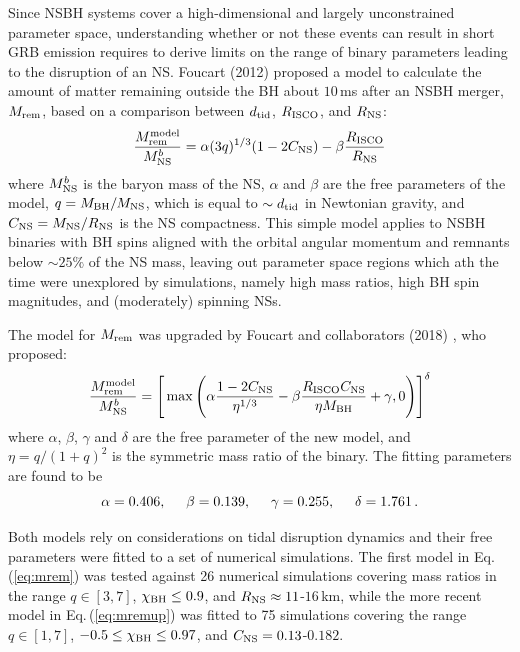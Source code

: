 \documentclass[binding=0.6cm, LaM]{sapthesis}
\begin{document}
        Since NSBH systems cover a high-dimensional and largely unconstrained parameter space,
        understanding whether or not these events can result in short GRB emission requires to
        derive limits on the range of binary parameters leading to the disruption of an NS.
        Foucart (2012) \cite{50} proposed a model to calculate the amount of matter remaining
        outside the BH about $10\,$ms after an NSBH merger, $M_{\rm rem}$, based on a comparison
        between $d_{\rm tid}$, $R_{\rm ISCO}$, and $R_{\rm NS}$:
        \begin{equation}
          \label{eq:mrem}
          {{M_{\rm rem}^{\rm model}} \over {M^b_{\rm NS}}} = \alpha(3q)^{1/3}(1 - 2C_{\rm NS}) - \beta{{R_{\rm ISCO}} \over {R_{\rm NS}}}
        \end{equation}
        where $M^b_{\rm NS}$ is the baryon mass of the NS, $\alpha$ and $\beta$ are the free parameters of the model,
        $q=M_{\rm BH}/M_{\rm NS}$, which is equal to $\sim d_{\rm tid}$ in Newtonian gravity, and $C_{\rm NS} = M_{\rm NS}/R_{\rm NS}$ is the NS compactness. 
        This simple model applies to NSBH binaries with BH spins aligned with the orbital angular momentum and remnants below
        $\sim 25\%$ of the NS mass, leaving out parameter space regions which ath the time were unexplored by simulations, 
        namely high mass ratios, high BH spin magnitudes, and (moderately) spinning NSs.

        The model for $M_{\rm rem}$ was upgraded by Foucart and collaborators (2018) \cite{54}, who proposed:
        \begin{equation}
          \label{eq:mremup}
          {{M_{\rm rem}^{\rm model}} \over {M^b_{\rm NS}}} = \Bigg[ \max \Bigg( \alpha{{1 - 2C_{\rm NS}} \over {\eta^{1/3}}} - \beta {{R_{\rm ISCO}C_{\rm NS}} \over{\eta M_{\rm BH}}} + \gamma, 0 \Bigg)\Bigg]^{\delta}
        \end{equation}
        where $\alpha$, $\beta$, $\gamma$ and $\delta$ are the free parameter of the new model, and $\eta = q/(1+q)^2$ is the symmetric mass ratio of the binary.  The fitting parameters are found to be
	\begin{equation}
		\alpha=0.406, \hspace*{0.5cm}  \beta=0.139, \hspace*{0.5cm}  \gamma=0.255, \hspace*{0.5cm} \delta=1.761\,.
	\end{equation}

        Both models rely on considerations on tidal disruption dynamics and
        their free parameters were fitted to a set of numerical simulations.
        The first model in Eq.\,(\ref{eq:mrem}) was tested against 26 numerical simulations covering mass ratios
        in the range $q\in [3,7]$, $\chi_{\rm BH}\leq 0.9$, and $R_{\rm NS} \approx 11$-$16\,$km,
        while the more recent model in Eq.\,(\ref{eq:mremup}) was fitted to 75 simulations covering the range $q\in [1,7]$, $-0.5 \leq \chi_{\rm BH}\leq 0.97$,
        and $C_{\rm NS} = 0.13$-$0.182$.
\end{document}
